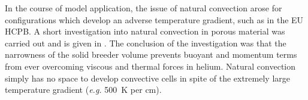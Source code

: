 In the course of model application, the issue of natural convection arose for configurations which develop an adverse temperature gradient, such as in the EU HCPB. A short investigation into natural convection in porous material was carried out and is given in . The conclusion of the investigation was that the narrowness of the solid breeder volume prevents buoyant and momentum terms from ever overcoming viscous and thermal forces in helium. Natural convection simply has no space to develop convective cells in spite of the extremely large temperature gradient (\textit{e.g.} \SI{500}{\kelvin} per \si{\centi\meter}).

































